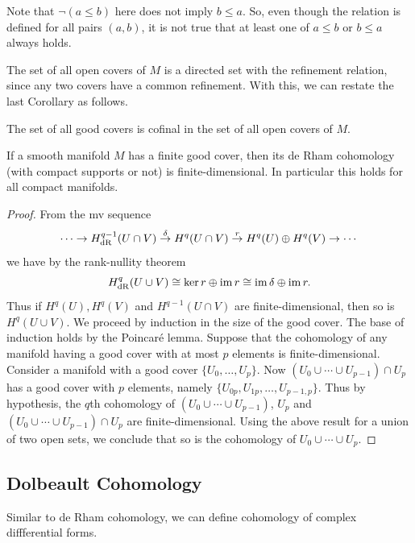 \documentclass[english,letterpaper]{article}%
\numberwithin{equation}{section}
\numberwithin{figure}{section}
\numberwithin{table}{section}
\theoremstyle{definition}
\theoremstyle{definition}
\theoremstyle{definition}
\theoremstyle{plain}
\theoremstyle{plain}
\theoremstyle{plain}
\theoremstyle{plain}
\theoremstyle{remark}
\theoremstyle{remark}
\renewcommand{\leq}{\leqslant}
\DeclareMathOperator{\im}{im}
\begin{document}
Note that $\lnot (a\leq b)$ here does not imply $b\leq a$. So, even though the relation is defined for all pairs $(a,b)$, it is not true that at least one of $a\leq b$ or $b\leq a$ always holds.
    
The set of all open covers of $M$ is a directed set with the refinement relation, since any two covers have a common refinement. With this, we can restate the last Corollary as follows.

\begin{cor}
    The set of all good covers is cofinal in the set of all open covers of $M$.
\end{cor}

\begin{prop}
    If a smooth manifold $M$ has a finite good cover, then its de Rham cohomology (with compact supports or not) is finite-dimensional. In particular this holds for all compact manifolds.
\end{prop}
\begin{proof}
     From the \gls{mv} sequence 
     \[\cdots\to H^{q-1}_{\rm dR}(U\cap V)\overset{\delta}\to H^q(U\cap V)\overset{r}\to H^q(U)\oplus H^q(V)\to\cdots\]
     we have by the rank-nullity theorem
     \[H^q_{\rm dR}(U\cup V)\cong \ker r\oplus\im r\cong \im \delta\oplus\im r.\]
     Thus if $H^q(U), H^q(V)$ and $H^{q-1}(U\cap V)$ are finite-dimensional, then so is $H^q(U\cup V)$.
     We proceed by induction in the size of the good cover. The base of induction holds by the Poincar\'e lemma. Suppose that the cohomology of any manifold having a good cover with at most $p$ elements is finite-dimensional. Consider a manifold with a good cover $\{U_0,\ldots,U_{p}\}$. Now $(U_0\cup \cdots \cup U_{p-1})\cap U_{p}$ has a good cover with $p$ elements, namely $\{U_{0p},U_{1p},\ldots,U_{p-1,p}\}$. Thus by hypothesis, the $q$th cohomology of $(U_0\cup \cdots \cup U_{p-1})$, $U_p$ and $(U_0\cup \cdots \cup U_{p-1})\cap U_{p}$ are finite-dimensional. Using the above result for a union of two open sets, we conclude that so is the cohomology of $U_0\cup \cdots\cup U_p$.
\end{proof}



\subsection{Dolbeault Cohomology}

Similar to de Rham cohomology, we can define cohomology of complex diffferential forms.
\end{document}
